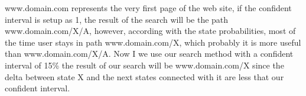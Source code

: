 www.domain.com represents the very first page of the web site, if the confident interval is setup as 1, the result of the search will be the path www.domain.com/X/A, however, according with the state probabilities, most of the time user stays in path www.domain.com/X, which probably it is more useful than www.domain.com/X/A. Now I we use our search method with a confident interval of 15\% the result of our search will be www.domain.com/X since the delta between state X and the next states connected with it are less that our confident interval.




